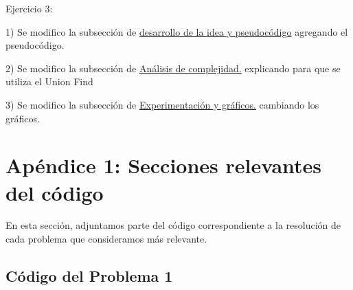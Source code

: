 \documentclass[a4paper]{article}
\begin{document}
Ejercicio 3: \newline

1) Se modifico la subsección de \underline{desarrollo de la idea y pseudocódigo} agregando el pseudocódigo.

2) Se modifico la subsección de \underline{Análisis de complejidad.} explicando para que se utiliza el Union Find

3) Se modifico la subsección de \underline{Experimentación y gráficos.} cambiando los gráficos.

\newpage
\section{Apéndice 1: Secciones relevantes del código}
En esta sección, adjuntamos parte del código correspondiente a la resolución de cada problema
que consideramos más relevante.

\subsection{Código del Problema 1}
\end{document}
